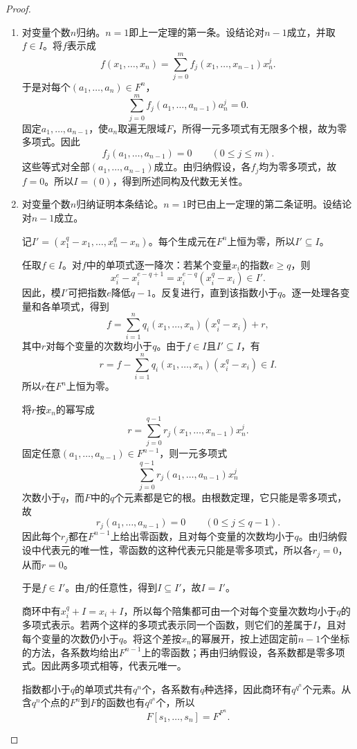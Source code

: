 \begin{proof}
\begin{enumerate}
\item 对变量个数$n$归纳。$n=1$即上一定理的第一条。设结论对$n-1$成立，并取$f\in I$。将$f$表示成
\[
f(x_1,\ldots,x_n)=\sum_{j=0}^m f_j(x_1,\ldots,x_{n-1})x_n^j.
\]
于是对每个$(a_1,\ldots,a_n)\in F^n$，
\[
\sum_{j=0}^m f_j(a_1,\ldots,a_{n-1})a_n^j=0.
\]
固定$a_1,\ldots,a_{n-1}$，使$a_n$取遍无限域$F$，所得一元多项式有无限多个根，故为零多项式。因此
\[
f_j(a_1,\ldots,a_{n-1})=0\qquad(0\le j\le m).
\]
这些等式对全部$(a_1,\ldots,a_{n-1})$成立。由归纳假设，各$f_j$均为零多项式，故$f=0$。所以$I=(0)$，得到所述同构及代数无关性。

\item 对变量个数$n$归纳证明本条结论。$n=1$时已由上一定理的第二条证明。设结论对$n-1$成立。

记$I'=(x_1^q-x_1,\ldots,x_n^q-x_n)$。每个生成元在$F^n$上恒为零，所以$I'\subseteq I$。

任取$f\in I$。对$f$中的单项式逐一降次：若某个变量$x_i$的指数$e\ge q$，则
\[
x_i^e-x_i^{e-q+1}=x_i^{e-q}(x_i^q-x_i)\in I'.
\]
因此，模$I'$可把指数$e$降低$q-1$。反复进行，直到该指数小于$q$。逐一处理各变量和各单项式，得到
\[
f=\sum_{i=1}^n q_i(x_1,\ldots,x_n)(x_i^q-x_i)+r,
\]
其中$r$对每个变量的次数均小于$q$。由于$f\in I$且$I'\subseteq I$，有
\[
r=f-\sum_{i=1}^n q_i(x_1,\ldots,x_n)(x_i^q-x_i)\in I.
\]
所以$r$在$F^n$上恒为零。

将$r$按$x_n$的幂写成
\[
r=\sum_{j=0}^{q-1}r_j(x_1,\ldots,x_{n-1})x_n^j.
\]
固定任意$(a_1,\ldots,a_{n-1})\in F^{n-1}$，则一元多项式
\[
\sum_{j=0}^{q-1}r_j(a_1,\ldots,a_{n-1})x_n^j
\]
次数小于$q$，而$F$中的$q$个元素都是它的根。由根数定理，它只能是零多项式，故
\[
r_j(a_1,\ldots,a_{n-1})=0\qquad(0\le j\le q-1).
\]
因此每个$r_j$都在$F^{n-1}$上给出零函数，且对每个变量的次数均小于$q$。由归纳假设中代表元的唯一性，零函数的这种代表元只能是零多项式，所以各$r_j=0$，从而$r=0$。

于是$f\in I'$。由$f$的任意性，得到$I\subseteq I'$，故$I=I'$。

商环中有$x_i^q+I=x_i+I$，所以每个陪集都可由一个对每个变量次数均小于$q$的多项式表示。若两个这样的多项式表示同一个函数，则它们的差属于$I$，且对每个变量的次数仍小于$q$。将这个差按$x_n$的幂展开，按上述固定前$n-1$个坐标的方法，各系数均给出$F^{n-1}$上的零函数；再由归纳假设，各系数都是零多项式。因此两多项式相等，代表元唯一。

指数都小于$q$的单项式共有$q^n$个，各系数有$q$种选择，因此商环有$q^{q^n}$个元素。从含$q^n$个点的$F^n$到$F$的函数也有$q^{q^n}$个，所以
\[
F[s_1,\ldots,s_n]=F^{F^n}.
\]
\end{enumerate}
\end{proof}


